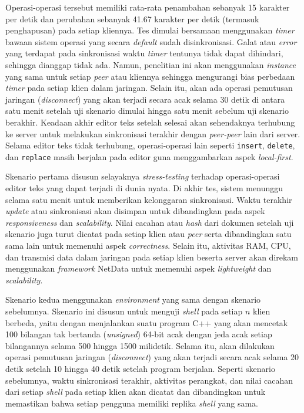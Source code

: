 Operasi-operasi tersebut memiliki rata-rata penambahan sebanyak 15 karakter per detik dan perubahan sebanyak 41.67 karakter per detik (termasuk penghapusan) pada setiap kliennya. Tes dimulai bersamaan menggunakan \textit{timer} bawaan sistem operasi yang secara \textit{default} sudah disinkronisasi. Galat atau \textit{error} yang terdapat pada sinkronisasi waktu \textit{timer} tentunya tidak dapat dihindari, sehingga dianggap tidak ada. Namun, penelitian ini akan menggunakan \textit{instance} yang sama untuk setiap \textit{peer} atau kliennya sehingga mengurangi bias perbedaan \textit{timer} pada setiap klien dalam jaringan. Selain itu, akan ada operasi pemutusan jaringan (\textit{disconnect}) yang akan terjadi secara acak selama 30 detik di antara satu menit setelah uji skenario dimulai hingga satu menit sebelum uji skenario berakhir. Keadaan akhir editor teks setelah selesai akan sehendaknya terhubung ke server untuk melakukan sinkronisasi terakhir dengan \textit{peer-peer} lain dari server. Selama editor teks tidak terhubung, operasi-operasi lain seperti \texttt{insert}, \texttt{delete}, dan \texttt{replace} masih berjalan pada editor guna menggambarkan aspek \textit{local-first}.

Skenario pertama disusun selayaknya \textit{stress-testing} terhadap operasi-operasi editor teks yang dapat terjadi di dunia nyata. Di akhir tes, sistem menunggu selama satu menit untuk memberikan kelonggaran sinkronisasi. Waktu terakhir \textit{update} atau sinkronisasi akan disimpan untuk dibandingkan pada aspek \textit{responsiveness} dan \textit{scalability}. Nilai cacahan atau \textit{hash} dari dokumen setelah uji skenario juga turut dicatat pada setiap klien atau \textit{peer} serta dibandingkan satu sama lain untuk memenuhi aspek \textit{correctness}. Selain itu, aktivitas RAM, CPU, dan transmisi data dalam jaringan pada setiap klien beserta server akan direkam menggunakan \textit{framework} NetData untuk memenuhi aspek \textit{lightweight} dan \textit{scalability}.

Skenario kedua menggunakan \textit{environment} yang sama dengan skenario sebelumnya. Skenario ini disusun untuk menguji \textit{shell} pada setiap $n$ klien berbeda, yaitu dengan menjalankan suatu program C++ yang akan mencetak 100 bilangan tak bertanda (\textit{unsigned}) 64-bit acak dengan jeda acak setiap bilangannya selama 500 hingga 1500 milidetik. Selama itu, akan dilakukan operasi pemutusan jaringan (\textit{disconnect}) yang akan terjadi secara acak selama 20 detik setelah 10 hingga 40 detik setelah program berjalan. Seperti skenario sebelumnya, waktu sinkronisasi terakhir, aktivitas perangkat, dan nilai cacahan dari setiap \textit{shell} pada setiap klien akan dicatat dan dibandingkan untuk memastikan bahwa setiap pengguna memiliki replika \textit{shell} yang sama.

